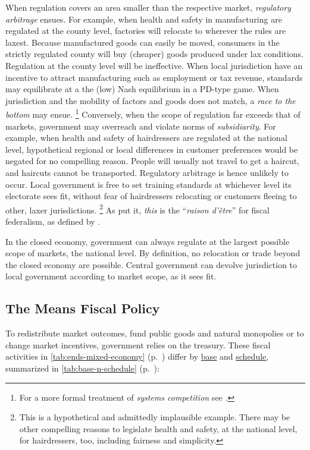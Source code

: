\begin{description}
	When regulation covers an area smaller than the respective market, \emph{regulatory arbitrage} ensues.
	For example, when health and safety in manufacturing are regulated at the county level, factories will relocate to wherever the rules are laxest.
	Because manufactured goods can easily be moved, consumers in the strictly regulated county will buy (cheaper) goods produced under lax conditions.
	Regulation at the county level will be ineffective.
	When local jurisdiction have an incentive to attract manufacturing such as employment or tax revenue, standards may equilibrate at a the (low) Nash equilibrium in a \gls{PD}-type game.
	When jurisdiction and the mobility of factors and goods does not match, a \emph{race to the bottom} may ensue.
	\footnote{
		For a more formal treatment of \emph{systems competition} see \cite{Sinn2004}.
	}
	Conversely, when the scope of regulation far exceeds that of markets, government may overreach and violate norms of \emph{subsidiarity}.
	For example, when health and safety of hairdressers are regulated at the national level, hypothetical regional or local differences in customer preferences would be negated for no compelling reason.
	People will usually not travel to get a haircut, and haircuts cannot be transported.
	Regulatory arbitrage is hence unlikely to occur.
	Local government is free to set training standards at whichever level its electorate sees fit, without fear of hairdressers relocating or customers fleeing to other, laxer jurisdictions.
	\footnote{
		This is a hypothetical and admittedly implausible example.
		There may be other compelling reasons to legislate health and safety, at the national level, for hairdressers, too, including fairness and simplicity.
	}
	As \citeauthor{Bordo2011} put it, \emph{this} is the ``\emph{raison d'\^{e}tre}'' \citeyearpar[4]{Bordo2011} for fiscal federalism, as defined by \cite{Oates1972}.

	In the closed economy, government can always regulate at the largest possible scope of markets, the national level.
	By definition, no relocation or trade beyond the closed economy are possible.
	Central government can devolve jurisdiction to local government according to market scope, as it sees fit.
\end{description}

\subsection[Fiscal Policy]{The Means Fiscal Policy}
\label{sec:fiscal}
To redistribute market outcomes, fund public goods and natural monopolies or to change market incentives, government relies on the treasury.
These fiscal activities in \autoref{tab:ends-mixed-economy} (p.~\pageref{tab:ends-mixed-economy}) differ by \hyperref[itm:base]{base} and \hyperref[itm:schedule]{schedule}, summarized in \autoref{tab:base-n-schedule} (p.~\pageref{tab:base-n-schedule}):

